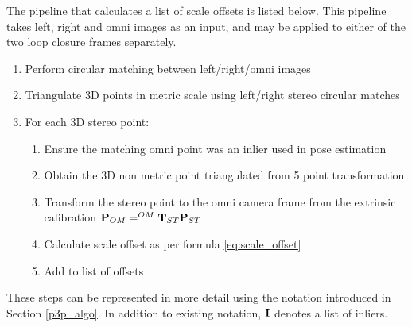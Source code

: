 The pipeline that calculates a list of scale offsets is listed below. This pipeline takes left, right and omni images as an input, and may be applied to either of the two loop closure frames separately. 

\begin{enumerate}
\itemsep0em
 \item Perform circular matching between left/right/omni images 
 \item Triangulate 3D points in metric scale using left/right stereo circular matches
 \item For each 3D stereo point:
 \begin{enumerate}
   \item Ensure the matching omni point was an inlier used in pose estimation
   \item Obtain the 3D non metric point triangulated from 5 point transformation
   \item Transform the stereo point to the omni camera frame from the extrinsic calibration $\mathbf P_{OM} =  ^{OM}\mathbf T_{ST} \mathbf P_{ST}$
   \item Calculate scale offset as per formula \ref{eq:scale_offset}
   \item Add to list of offsets 
 \end{enumerate}
\end{enumerate} 

These steps can be represented in more detail using the notation introduced in Section \ref{p3p_algo}.  In addition to existing notation, $\mathbf{I}$ denotes a list of inliers.


